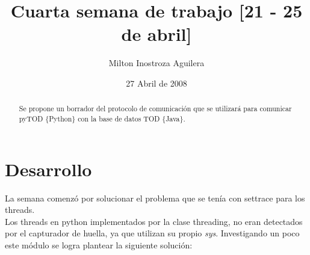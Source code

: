 \documentclass[10pt,a4paper]{article}
\begin{document}
\renewcommand{\contentsname}{Indice} 
\renewcommand\listfigurename{Lista de Figuras}
\renewcommand\listtablename{Lista de Tablas}
\renewcommand\bibname{Bibliografía}
\renewcommand{\refname}{Bibliografía}
\renewcommand\indexname{Indice alfabético}
\renewcommand\figurename{Figura}
\renewcommand\tablename{Tabla}
\renewcommand\partname{Parte}
\renewcommand\chaptername{Capítulo}
\renewcommand\appendixname{Apéndice}
\renewcommand\abstractname{Resumen}

\title{Cuarta semana de trabajo [21 - 25 de abril]}
\author{Milton Inostroza Aguilera}
\date{27 Abril de 2008}
\clearpage
\maketitle

\begin{abstract}
Se propone un borrador del protocolo de comunicación que se utilizará para comunicar pyTOD \{Python\} con la base de datos TOD \{Java\}.

\end{abstract}
\newpage
\tableofcontents
\newpage
\listoffigures
\newpage
\listoftables
\newpage
\section{Desarrollo}
La semana comenzó por solucionar el problema que se tenía con settrace para los threads.\\

Los threads en python implementados por la clase threading, no eran detectados por el capturador de huella, ya que utilizan su propio \textit{sys}.  Investigando un poco este módulo se logra plantear la siguiente solución:
\end{document}
